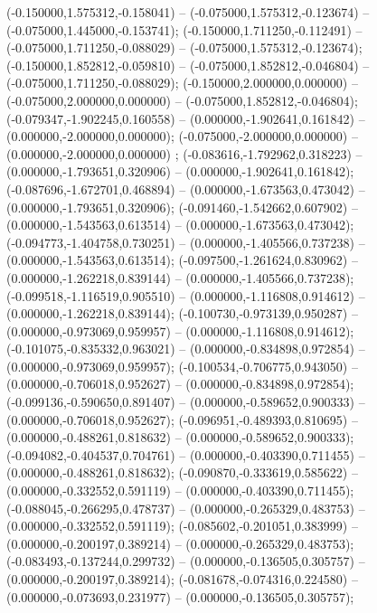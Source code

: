  (-0.150000,1.575312,-0.158041) -- (-0.075000,1.575312,-0.123674) -- (-0.075000,1.445000,-0.153741);
 (-0.150000,1.711250,-0.112491) -- (-0.075000,1.711250,-0.088029) -- (-0.075000,1.575312,-0.123674);
 (-0.150000,1.852812,-0.059810) -- (-0.075000,1.852812,-0.046804) -- (-0.075000,1.711250,-0.088029);
 (-0.150000,2.000000,0.000000) -- (-0.075000,2.000000,0.000000) -- (-0.075000,1.852812,-0.046804);
 (-0.079347,-1.902245,0.160558) -- (0.000000,-1.902641,0.161842) -- (0.000000,-2.000000,0.000000);
 (-0.075000,-2.000000,0.000000) -- (0.000000,-2.000000,0.000000) ;
 (-0.083616,-1.792962,0.318223) -- (0.000000,-1.793651,0.320906) -- (0.000000,-1.902641,0.161842);
 (-0.087696,-1.672701,0.468894) -- (0.000000,-1.673563,0.473042) -- (0.000000,-1.793651,0.320906);
 (-0.091460,-1.542662,0.607902) -- (0.000000,-1.543563,0.613514) -- (0.000000,-1.673563,0.473042);
 (-0.094773,-1.404758,0.730251) -- (0.000000,-1.405566,0.737238) -- (0.000000,-1.543563,0.613514);
 (-0.097500,-1.261624,0.830962) -- (0.000000,-1.262218,0.839144) -- (0.000000,-1.405566,0.737238);
 (-0.099518,-1.116519,0.905510) -- (0.000000,-1.116808,0.914612) -- (0.000000,-1.262218,0.839144);
 (-0.100730,-0.973139,0.950287) -- (0.000000,-0.973069,0.959957) -- (0.000000,-1.116808,0.914612);
 (-0.101075,-0.835332,0.963021) -- (0.000000,-0.834898,0.972854) -- (0.000000,-0.973069,0.959957);
 (-0.100534,-0.706775,0.943050) -- (0.000000,-0.706018,0.952627) -- (0.000000,-0.834898,0.972854);
 (-0.099136,-0.590650,0.891407) -- (0.000000,-0.589652,0.900333) -- (0.000000,-0.706018,0.952627);
 (-0.096951,-0.489393,0.810695) -- (0.000000,-0.488261,0.818632) -- (0.000000,-0.589652,0.900333);
 (-0.094082,-0.404537,0.704761) -- (0.000000,-0.403390,0.711455) -- (0.000000,-0.488261,0.818632);
 (-0.090870,-0.333619,0.585622) -- (0.000000,-0.332552,0.591119) -- (0.000000,-0.403390,0.711455);
 (-0.088045,-0.266295,0.478737) -- (0.000000,-0.265329,0.483753) -- (0.000000,-0.332552,0.591119);
 (-0.085602,-0.201051,0.383999) -- (0.000000,-0.200197,0.389214) -- (0.000000,-0.265329,0.483753);
 (-0.083493,-0.137244,0.299732) -- (0.000000,-0.136505,0.305757) -- (0.000000,-0.200197,0.389214);
 (-0.081678,-0.074316,0.224580) -- (0.000000,-0.073693,0.231977) -- (0.000000,-0.136505,0.305757);
